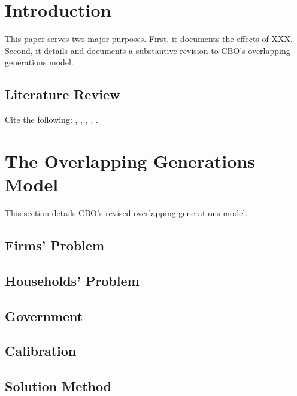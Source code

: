 \documentclass[letterpaper,12pt]{article}
\numberwithin{equation}{section}
\numberwithin{figure}{section}
\numberwithin{table}{section}
\begin{document}
\begin{spacing}{1.5}

\section{Introduction} \label{sec_intro}

	This paper serves two major purposes.  First, it documents the effects of XXX.  Second, it details and documents a substantive revision to CBO's overlapping generations model.

	\subsection{Literature Review} \label{sec_intro_lit}

		Cite the following: \citet{Auerbach.Kotlikoff:1987}, \citet{NishiyamaSmetters:2007}, \citet{Nishiyama.Smetters:2014}, \citet{NishiyamaReichling:2015}, \citet{NelsonEtal:2019}.


\section{The Overlapping Generations Model} \label{sec_OLGModel}

	This section details CBO's revised overlapping generations model.

	\subsection{Firms' Problem} \label{sec_OLGModel_firms}

	\subsection{Households' Problem} \label{sec_OLGModel_HH}

	\subsection{Government} \label{sec_OLGModel_govt}

	\subsection{Calibration} \label{sec_OLGModel_calib}

	\subsection{Solution Method} \label{sec_OLGModel_soln}



\end{spacing}
\end{document}

